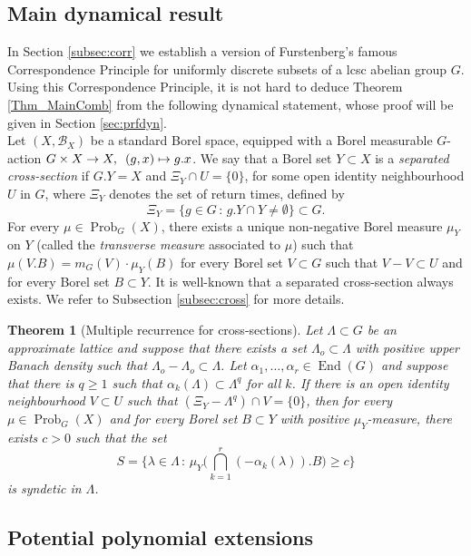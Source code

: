\documentclass[12pt,reqno,a4paper]{amsart}
\numberwithin{equation}{section}
\newcommand{\ra}{\rightarrow}
\DeclareMathOperator{\End}{End}
\DeclareMathOperator{\Prob}{Prob}
\theoremstyle{theorem}
\newtheorem{theorem}{Theorem}[section]
\theoremstyle{task}
\theoremstyle{definition}
\begin{document}
\subsection{Main dynamical result}

In Section \ref{subsec:corr} we establish a version of Furstenberg's famous Correspondence Principle for uniformly discrete subsets of a lcsc abelian group $G$.
Using this Correspondence Principle, it is not hard to deduce Theorem \ref{Thm_MainComb} from the following dynamical statement, whose proof will be given in Section \ref{sec:prfdyn}. \\

Let $(X,\mathscr{B}_X)$ be a standard Borel space, equipped with a Borel measurable $G$-action $G \times X \ra X, \enskip (g,x) \mapsto g.x$. We say that a Borel set $Y \subset X$ is a \emph{separated cross-section} if $G.Y = X$ and $\Xi_Y \cap U = \{0\}$, for some open identity neighbourhood $U$ in $G$, where $\Xi_Y$ denotes the set of return times, defined by
\[
\Xi_Y = \{ g \in G \, : \, g.Y \cap Y \neq \emptyset \} \subset G.
\]
For every $\mu \in \Prob_G(X)$, there exists a unique non-negative Borel measure 
$\mu_Y$ on $Y$ (called the \emph{transverse measure} associated to $\mu$) such that 
$\mu(V.B) = m_G(V) \cdot \mu_Y(B)$ for every Borel set $V \subset G$ such that $V-V \subset U$ and for every Borel set $B \subset Y$. It is well-known that a separated cross-section always exists. We refer to Subsection \ref{subsec:cross} for more details.

\begin{theorem}[Multiple recurrence for cross-sections]
\label{Thm_MainErg}
Let $\Lambda \subset G$ be an approximate lattice and suppose that there exists a set $\Lambda_o \subset \Lambda$ with positive upper Banach density such that $\Lambda_o - \Lambda_o \subset \Lambda$. Let $\alpha_1,\ldots,\alpha_r \in \End(G)$ and suppose that there is
$q \geq 1$ such that $\alpha_k(\Lambda) \subset \Lambda^q$ for all $k$. If there 
is an open identity neighbourhood $V \subset U$
such that $(\Xi_Y - \Lambda^q) \cap V = \{0\}$, then for every
$\mu \in \Prob_G(X)$ and for every Borel set $B \subset Y$
with positive $\mu_Y$-measure, there exists $c > 0$ such that the set
\[
S = \Big\{ \lambda \in \Lambda \, : \, \mu_Y\Big( \bigcap_{k=1}^r (-\alpha_k(\lambda)).B\Big) \geq c \Big\}
\]
is syndetic in $\Lambda$.
\end{theorem}

\subsection{Potential polynomial extensions}
\end{document}
